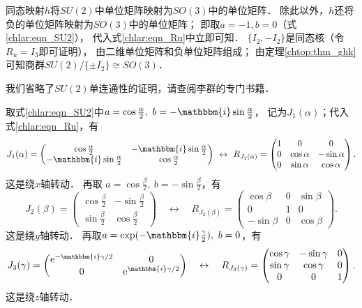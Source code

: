 同态映射$h$将$SU(2)$中单位矩阵映射为$SO(3)$中的单位矩阵．
除此以外，$h$还将负的单位矩阵映射为$SO(3)$中的单位矩阵；
即取$a=-1,b=0$（式\eqref{chlar:eqn_SU2}），
代入式\eqref{chlar:eqn_Ru}中立即可知．
$\{I_2,-I_2\}$是同态核（令$R_u = I_3$即可证明），
由二维单位矩阵和负单位矩阵组成；
由定理\ref{chtop:thm_ghk}可知商群$SU(2)/\{\pm I_2\}\cong SO(3)$．

我们省略了$SU(2)$单连通性的证明，请查阅李群的专门书籍．

取式\eqref{chlar:eqn_SU2}中$a=\cos \frac{\alpha}{2},\ b=-\mathbbm{i}\sin \frac{\alpha}{2}$，
记为$J_1({\alpha})$；代入式\eqref{chlar:eqn_Ru}，有
\begin{equation}\label{chlar:eqn_su2-x}
    J_1(\alpha)=\begin{pmatrix}
        \cos \frac{\alpha}{2} & -\mathbbm{i}\sin \frac{\alpha}{2} \\
        -\mathbbm{i}\sin \frac{\alpha}{2} & \cos \frac{\alpha}{2}
    \end{pmatrix}
    \ \leftrightarrow \
    R_{J_1(\alpha)}=\begin{pmatrix}
        1 & 0 & 0 \\
        0 & \cos \alpha &  -\sin \alpha \\
        0 & \sin \alpha &  \cos \alpha
    \end{pmatrix} .
\end{equation}
这是绕$x$轴转动．
再取 $a=\cos \frac{\beta}{2},\ b=-\sin \frac{\beta}{2}$，有
\begin{equation}\label{chlar:eqn_su2-y}
    J_2(\beta)=\begin{pmatrix}
        \cos \frac{\beta}{2} & -\sin \frac{\beta}{2} \\
        \sin \frac{\beta}{2} & \cos \frac{\beta}{2}
    \end{pmatrix}
    \quad \leftrightarrow \quad
    R_{J_2(\beta)}=\begin{pmatrix}
        \cos \beta & 0 & \sin \beta \\
        0 & 1 & 0 \\
        -\sin \beta & 0 & \cos \beta
    \end{pmatrix} .
\end{equation}
这是绕$y$轴转动．
再取$a=\exp(-\mathbbm{i}\frac{\gamma}{2}),\ b=0$，有
\begin{equation}\label{chlar:eqn_su2-z}
    J_3(\gamma)= \begin{pmatrix}
        \mathrm{e}^{-\mathbbm{i} \gamma / 2} & 0 \\
        0 & \mathrm{e}^{\mathbbm{i} \gamma / 2}
    \end{pmatrix}
    \quad \leftrightarrow \quad
    R_{J_3(\gamma)}=\begin{pmatrix}
        \cos \gamma & -\sin \gamma & 0 \\
        \sin \gamma & \cos \gamma & 0 \\
        0 & 0 & 1
    \end{pmatrix} .
\end{equation}
这是绕$z$轴转动．



